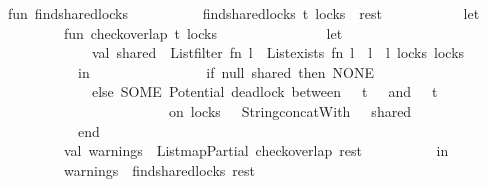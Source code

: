 \begin{isabellebody}
\ \ \ \ fun\ find{\isacharunderscore}{\kern0pt}shared{\isacharunderscore}{\kern0pt}locks\ {\isacharbrackleft}{\kern0pt}{\isacharbrackright}{\kern0pt}\ {\isacharequal}{\kern0pt}\ {\isacharbrackleft}{\kern0pt}{\isacharbrackright}{\kern0pt}\isanewline
\ \ \ \ \ \ {\isacharbar}{\kern0pt}\ find{\isacharunderscore}{\kern0pt}shared{\isacharunderscore}{\kern0pt}locks\ {\isacharparenleft}{\kern0pt}{\isacharparenleft}{\kern0pt}t{}{\isacharcomma}{\kern0pt}\ locks{}{\isacharparenright}{\kern0pt}\ {\isacharcolon}{\kern0pt}{\isacharcolon}{\kern0pt}\ rest{\isacharparenright}{\kern0pt}\ {\isacharequal}{\kern0pt}\isanewline
\ \ \ \ \ \ \ \ \ \ let\isanewline
\ \ \ \ \ \ \ \ \ \ \ \ fun\ check{\isacharunderscore}{\kern0pt}overlap\ {\isacharparenleft}{\kern0pt}t{}{\isacharcomma}{\kern0pt}\ locks{}{\isacharparenright}{\kern0pt}\ {\isacharequal}{\kern0pt}\isanewline
\ \ \ \ \ \ \ \ \ \ \ \ \ \ let\isanewline
\ \ \ \ \ \ \ \ \ \ \ \ \ \ \ \ val\ shared\ {\isacharequal}{\kern0pt}\ List{\isachardot}{\kern0pt}filter\ {\isacharparenleft}{\kern0pt}fn\ l\ {\isacharequal}{\kern0pt}{\isachargreater}{\kern0pt}\ List{\isachardot}{\kern0pt}exists\ {\isacharparenleft}{\kern0pt}fn\ l{}\ {\isacharequal}{\kern0pt}{\isachargreater}{\kern0pt}\ l\ {\isacharequal}{\kern0pt}\ l{}{\isacharparenright}{\kern0pt}\ locks{}{\isacharparenright}{\kern0pt}\ locks{}\isanewline
\ \ \ \ \ \ \ \ \ \ \ \ \ \ in\isanewline
\ \ \ \ \ \ \ \ \ \ \ \ \ \ \ \ if\ null\ shared\ then\ NONE\isanewline
\ \ \ \ \ \ \ \ \ \ \ \ \ \ \ \ else\ SOME\ {\isacharparenleft}{\kern0pt}{\isachardoublequote}{\kern0pt}Potential\ deadlock\ between\ {\isachardoublequote}{\kern0pt}\ {\isacharcircum}{\kern0pt}\ t{}\ {\isacharcircum}{\kern0pt}\ {\isachardoublequote}{\kern0pt}\ and\ {\isachardoublequote}{\kern0pt}\ {\isacharcircum}{\kern0pt}\ t{}\ {\isacharcircum}{\kern0pt}\ \isanewline
\ \ \ \ \ \ \ \ \ \ \ \ \ \ \ \ \ \ \ \ \ \ \ \ \ \ {\isachardoublequote}{\kern0pt}\ on\ locks{\isacharcolon}{\kern0pt}\ {\isachardoublequote}{\kern0pt}\ {\isacharcircum}{\kern0pt}\ String{\isachardot}{\kern0pt}concatWith\ {\isachardoublequote}{\kern0pt}{\isacharcomma}{\kern0pt}\ {\isachardoublequote}{\kern0pt}\ shared{\isacharparenright}{\kern0pt}\isanewline
\ \ \ \ \ \ \ \ \ \ \ \ \ \ end\isanewline
\ \ \ \ \ \ \ \ \ \ \ \ val\ warnings\ {\isacharequal}{\kern0pt}\ List{\isachardot}{\kern0pt}mapPartial\ check{\isacharunderscore}{\kern0pt}overlap\ rest\isanewline
\ \ \ \ \ \ \ \ \ \ in\isanewline
\ \ \ \ \ \ \ \ \ \ \ \ warnings\ {\isacharat}{\kern0pt}\ find{\isacharunderscore}{\kern0pt}shared{\isacharunderscore}{\kern0pt}locks\ rest\isanewline

\end{isabellebody}
